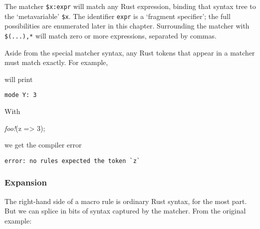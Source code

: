 \documentclass[a4paper,]{book}
\newenvironment{Shaded}{\begin{snugshade}}{\end{snugshade}}
\newcommand{\KeywordTok}[1]{\textcolor[rgb]{0.13,0.29,0.53}{\textbf{{#1}}}}
\newcommand{\DecValTok}[1]{\textcolor[rgb]{0.00,0.00,0.81}{{#1}}}
\newcommand{\StringTok}[1]{\textcolor[rgb]{0.31,0.60,0.02}{{#1}}}
\newcommand{\PreprocessorTok}[1]{\textcolor[rgb]{0.56,0.35,0.01}{\textit{{#1}}}}
\newcommand{\NormalTok}[1]{{#1}}
\begin{document}
The matcher \texttt{\$x:expr} will match any Rust expression, binding
that syntax tree to the `metavariable' \texttt{\$x}. The identifier
\texttt{expr} is a `fragment specifier'; the full possibilities are
enumerated later in this chapter. Surrounding the matcher with
\texttt{\$(...),*} will match zero or more expressions, separated by
commas.

Aside from the special matcher syntax, any Rust tokens that appear in a
matcher must match exactly. For example,

\begin{Shaded}
\end{Shaded}

will print

\begin{verbatim}
mode Y: 3
\end{verbatim}

With

\begin{Shaded}
\begin{Highlighting}[]
\PreprocessorTok{foo!}\NormalTok{(z => }\DecValTok{3}\NormalTok{);}
\end{Highlighting}
\end{Shaded}

we get the compiler error

\begin{verbatim}
error: no rules expected the token `z`
\end{verbatim}

\subsubsection{Expansion}\label{expansion}

The right-hand side of a macro rule is ordinary Rust syntax, for the
most part. But we can splice in bits of syntax captured by the matcher.
From the original example:

\begin{Shaded}
\end{Shaded}
\end{document}
